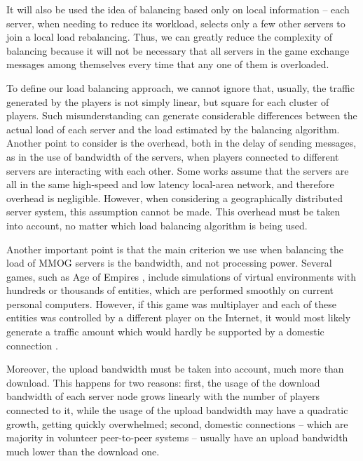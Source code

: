 It will also be used the idea of balancing based only on local information -- each server, when needing to reduce its workload, selects only a few other servers to join a local load rebalancing. Thus, we can greatly reduce the complexity of balancing because it will not be necessary that all servers in the game exchange messages among themselves every time that any one of them is overloaded.

To define our load balancing approach, we cannot ignore that, usually, the traffic generated by the players is not simply linear, but square for each cluster of players. Such misunderstanding can generate considerable differences between the actual load of each server and the load estimated by the balancing algorithm. Another point to consider is the overhead, both in the delay of sending messages, as in the use of bandwidth of the servers, when players connected to different servers are interacting with each other. Some works assume that the servers are all in the same high-speed and low latency local-area network, and therefore overhead is negligible. However, when considering a geographically distributed server system, this assumption cannot be made. This overhead must be taken into account, no matter which load balancing algorithm is being used.

Another important point is that the main criterion we use when balancing the load of MMOG servers is the bandwidth, and not processing power. Several games, such as Age of Empires \cite{ageofempires}, include simulations of virtual environments with hundreds or thousands of entities, which are performed smoothly on current personal computers. However, if this game was multiplayer and each of these entities was controlled by a different player on the Internet, it would most likely generate a traffic amount which would hardly be supported by a domestic connection \cite{feng2007wnn}.

Moreover, the upload bandwidth must be taken into account, much more than download. This happens for two reasons: first, the usage of the download bandwidth of each server node grows linearly with the number of players connected to it, while the usage of the upload bandwidth may have a quadratic growth, getting quickly overwhelmed; second, domestic connections -- which are majority in volunteer peer-to-peer systems -- usually have an upload bandwidth much lower than the download one.

